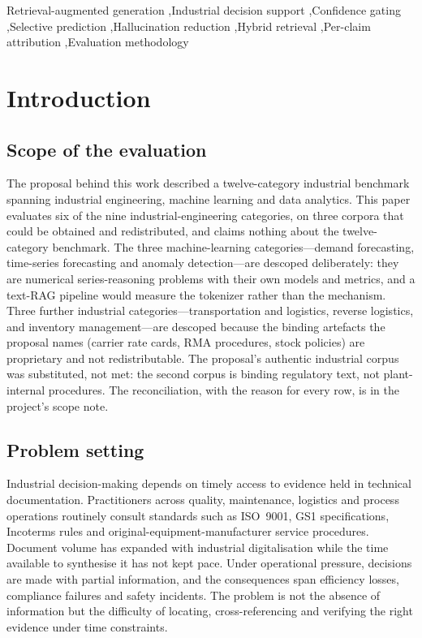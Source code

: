 \documentclass[preprint,3p,times]{elsarticle}
\begin{document}
\begin{keyword}
Retrieval-augmented generation \sep Industrial decision support \sep Confidence
gating \sep Selective prediction \sep Hallucination reduction \sep Hybrid
retrieval \sep Per-claim attribution \sep Evaluation methodology
\end{keyword}

\section{Introduction}

\subsection{Scope of the evaluation}

The proposal behind this work described a twelve-category industrial benchmark
spanning industrial engineering, machine learning and data analytics. This
paper evaluates six of the nine industrial-engineering categories, on three
corpora that could be obtained and redistributed, and claims nothing about the
twelve-category benchmark. The three machine-learning categories---demand
forecasting, time-series forecasting and anomaly detection---are descoped
deliberately: they are numerical series-reasoning problems with their own
models and metrics, and a text-RAG pipeline would measure the tokenizer
rather than the mechanism. Three further industrial categories---transportation
and logistics, reverse logistics, and inventory management---are descoped
because the binding artefacts the proposal names (carrier rate cards, RMA
procedures, stock policies) are proprietary and not redistributable. The
proposal's authentic industrial corpus was substituted, not met: the second
corpus is binding regulatory text, not plant-internal procedures. The
reconciliation, with the reason for every row, is in the project's scope note.

\subsection{Problem setting}

Industrial decision-making depends on timely access to evidence held in
technical documentation. Practitioners across quality, maintenance, logistics
and process operations routinely consult standards such as ISO~9001, GS1
specifications, Incoterms rules and original-equipment-manufacturer service
procedures. Document volume has expanded with industrial digitalisation while
the time available to synthesise it has not kept pace. Under operational
pressure, decisions are made with partial information, and the consequences span
efficiency losses, compliance failures and safety incidents. The problem is not
the absence of information but the difficulty of locating, cross-referencing and
verifying the right evidence under time constraints.
\end{document}
